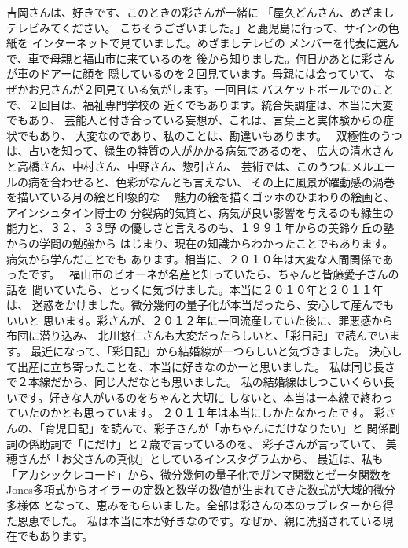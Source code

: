 \documentclass{jsarticle}
\begin{document}
吉岡さんは、好きです、このときの彩さんが一緒に
「屋久どんさん、めざましテレビみてください。
こちそうございました。」と鹿児島に行って、サインの色紙を
インターネットで見ていました。めざましテレビの
メンバーを代表に選んで、車で母親と福山市に来ているのを
後から知りました。何日かあとに彩さんが車のドアーに顔を
隠しているのを２回見ています。母親には会っていて、
なぜかお兄さんが２回見ている気がします。一回目は
バスケットボールでのことで、２回目は、福祉専門学校の
近くでもあります。統合失調症は、本当に大変でもあり、
芸能人と付き合っている妄想が、これは、言葉上と実体験からの症状でもあり、
大変なのであり、私のことは、勘違いもあります。　
双極性のうつは、占いを知って、緑生の特質の人がかかる病気であるのを、
広大の清水さんと高橋さん、中村さん、中野さん、惣引さん、
芸術では、このうつにメルエールの病を合わせると、色彩がなんとも言えない、
その上に風景が躍動感の渦巻を描いている月の絵と印象的な　
魅力の絵を描くゴッホのひまわりの絵画と、アインシュタイン博士の
分裂病的気質と、病気が良い影響を与えるのも緑生の能力と、３２、３３野
の優しさと言えるのも、１９９１年からの美鈴ケ丘の塾からの学問の勉強から
はじまり、現在の知識からわかったことでもあります。病気から学んだことでも
あります。相当に、２０１０年は大変な人間関係であったです。　
福山市のビオーネが名産と知っていたら、ちゃんと皆藤愛子さんの話を
聞いていたら、とっくに気づけました。本当に２０１０年と２０１１年は、
迷惑をかけました。微分幾何の量子化が本当だったら、安心して産んでもいいと
思います。彩さんが、２０１２年に一回流産していた後に、罪悪感から布団に潜り込み、
北川悠仁さんも大変だったらしいと、「彩日記」で読んでいます。
最近になって、「彩日記」から結婚線が一つらしいと気づきました。
決心して出産に立ち寄ったことを、本当に好きなのかーと思いました。
私は同じ長さで２本線だから、同じ人だなとも思いました。
私の結婚線はしつこいくらい長いです。好きな人がいるのをちゃんと大切に
しないと、本当は一本線で終わっていたのかとも思っています。
２０１１年は本当にしかたなかったです。
彩さんの、「育児日記」を読んで、彩子さんが「赤ちゃんにだけなりたい」と
関係副詞の係助詞で「にだけ」と２歳で言っているのを、
彩子さんが言っていて、
美穂さんが「お父さんの真似」としているインスタグラムから、
最近は、私も「アカシックレコード」から、微分幾何の量子化でガンマ関数とゼータ関数をJones多項式からオイラーの定数と数学の数値が生まれてきた数式が大域的微分多様体
となって、恵みをもらいました。全部は彩さんの本のラブレターから得た恩恵でした。
私は本当に本が好きなのです。なぜか、親に洗脳されている現在でもあります。
\end{document}
